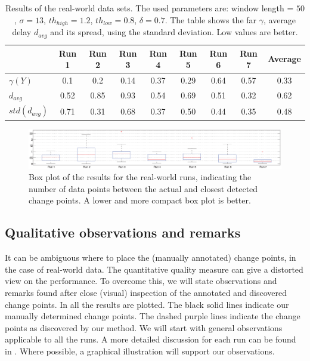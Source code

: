 \begin{table}
  \centering
  \caption[Results real world runs]{Results of the real-world data sets. The used parameters are: window length = $50$, $\sigma = 13$, $th_{high} = 1.2$, $th_{low} = 0.8$, $\delta = 0.7$.
  The table shows the \gls{far} $\gamma$, average delay $d_{avg}$ and its spread, using the standard deviation.
  Low values are better.
  }
  \begin{tabulary}{\textwidth}{|l|c|c|c|c|c|c|c||c|}
     & Run 1 & Run 2 & Run 3 & Run 4 & Run 5 & Run 6 & Run 7 & Average \\
    \hline
    $\gamma(Y)$ & 0.1 & 0.2 & 0.14 & 0.37 & 0.29 & 0.64 & 0.57 & 0.33 \\
    \hline
    $d_{avg}$ & 0.52 & 0.85 & 0.93 & 0.54 & 0.69 & 0.51 & 0.32 & 0.62\\
    \hline
    $std(d_{avg})$ & 0.71 & 0.31 & 0.68 & 0.37 & 0.50 & 0.44 & 0.35 & 0.48 \\
    \hline
  \end{tabulary}
  \label{tab:results_final_real_world}
\end{table}

\begin{figure}
\centering
  \includegraphics[width=1\textwidth]{./Figures/chapter6/data_collection/boxplot_final_runs.eps}
  \caption[Box plot results real-world runs]{Box plot of the results for the real-world runs, indicating the number of data points between the actual and closest detected change points. A lower and more compact box plot is better.}
  \label{fig:boxplot_final_real_world_runs}
\end{figure}

\subsection{Qualitative observations and remarks}\label{subsec:subjective_results}
It can be ambiguous where to place the (manually annotated) change points, in the case of real-world data.
The quantitative quality measure can give a distorted view on the performance.
To overcome this, we will state observations and remarks found after close (visual) inspection of the annotated and discovered change points.
In  all the results are plotted.
The black solid lines indicate our manually determined change points.
The dashed purple lines indicate the change points as discovered by our method.
We will start with general observations applicable to all the runs.
A more detailed discussion for each run can be found in .
Where possible, a graphical illustration will support our observations.

